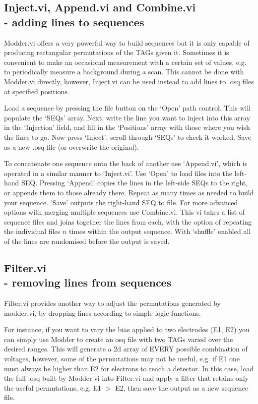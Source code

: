 \documentclass[10pt,a4paper]{article}
\begin{document}
\subsection[Inject.vi, Append.vi and Combine.vi]{Inject.vi, Append.vi and Combine.vi\\ %
	\normalsize - adding lines to sequences}
Modder.vi offers a very powerful way to build sequences but it is only capable of producing rectangular permutations of the TAGs given it.  Sometimes it is convenient to make an occasional measurement with a certain set of values, e.g. to periodically measure a background during a scan.  This cannot be done with Modder.vi directly, however, Inject.vi can be used instead to add lines to .osq files at specified positions.

Load a sequence by pressing the file button on the `Open' path control.  This will populate the `SEQs' array.  Next, write the line you want to inject into this array in the `Injection' field, and fill in the `Positions' array with those where you wish the lines to go.  Now press `Inject'; scroll through `SEQs'  to check it worked.  Save as a new .osq file (or overwrite the original).

To concatenate one sequence onto the back of another use `Append.vi', which is operated in a  similar manner to `Inject.vi'.  Use `Open' to load files into the left-hand SEQ. Pressing `Append' copies the lines in the left-side SEQs to the right, or appends them to those already there.  Repeat as many times as needed to build your sequence. `Save' outputs the right-hand SEQ to file. For more advanced options with merging multiple sequences use Combine.vi. This vi takes a list of sequence files and joins together the lines from each, with the option of repeating the individual files $n$ times within the output sequence.  With `shuffle' enabled all of the lines are randomised before the output is saved.

\subsection[Filter.vi]{Filter.vi\\ %
	\normalsize - removing lines from sequences}
Filter.vi provides another way to adjust the permutations generated by modder.vi, by dropping lines according to simple logic functions.  

For instance, if you want to vary the bias applied to two electrodes (E1, E2) you can simply use Modder to create an osq file with two TAGs varied over the desired ranges.  This will generate a 2d array of EVERY possible combination of voltages, however, some of the permutations may not be useful, e.g. if E1 one must always be higher than E2 for electrons to reach a detector.  In this case, load the full .osq built by Modder.vi into Filter.vi and apply a filter that retains only the useful permutations, e.g. E1 $>$ E2, then save the output as a new sequence file.
\end{document}
